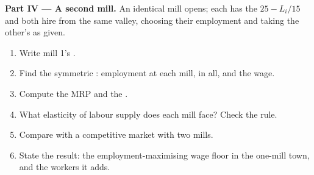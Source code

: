 \begin{problem}
\medskip\noindent\textbf{Part IV --- A second mill.} An identical mill opens;
each has the  $25 - L_i/15$ and both hire from the
same valley, choosing their employment and taking the other's as given.
\begin{enumerate}[resume]
  \item Write mill 1's .
  \item Find the symmetric : employment at each mill, in all, and the wage.
  \item Compute the MRP and the .
  \item What elasticity of labour supply does each mill face? Check the  rule.
  \item Compare with a competitive market with two mills.
  \item State the result: the employment-maximising wage floor in the one-mill town, and the workers it adds.
\end{enumerate}
\end{problem}
